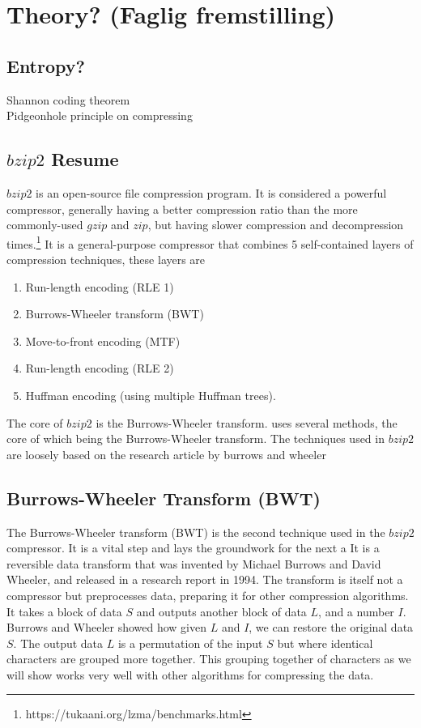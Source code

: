 \documentclass{article}
\begin{document}
\section{Theory? (Faglig fremstilling)}
\subsection{Entropy?}
Shannon coding theorem \\
Pidgeonhole principle on compressing


\subsection{\(bzip2\) Resume}
\(bzip2\) is an open-source file compression program. It is considered a powerful compressor, generally having a better compression ratio than the more commonly-used \(gzip\) and \(zip\), but having slower compression and decompression times.\footnote{https://tukaani.org/lzma/benchmarks.html}
It is a general-purpose compressor that combines 5 self-contained layers of compression techniques, these layers are
\begin{enumerate}
	\item Run-length encoding (RLE 1)
	\item Burrows-Wheeler transform (BWT)
	\item Move-to-front encoding (MTF)
	\item Run-length encoding (RLE 2)
	\item Huffman encoding (using multiple Huffman trees).
\end{enumerate}

The core of \(bzip2\) is the Burrows-Wheeler transform. uses several methods, the core of which being the Burrows-Wheeler transform. The techniques used in \(bzip2\) are loosely based on the research article by burrows and wheeler %

\subsection{}

\subsection{Burrows-Wheeler Transform (BWT)}
The Burrows-Wheeler transform (BWT) is the second technique used in the \(bzip2\) compressor. It is a vital step and lays the groundwork for the next a
It is a reversible data transform that was invented by Michael Burrows and David Wheeler, and released in a research report in 1994. The transform is itself not a compressor but preprocesses data, preparing it for other compression algorithms. It takes a block of data \(S\) and outputs another block of data \(L\), and a number \(I\). 
Burrows and Wheeler showed how given \(L\) and \(I\), we can restore the original data \(S\). The output data \(L\) is a permutation of the input \(S\) but where identical characters are grouped more together. This grouping together of characters as we will show works very well with other algorithms for compressing the data.
\end{document}
